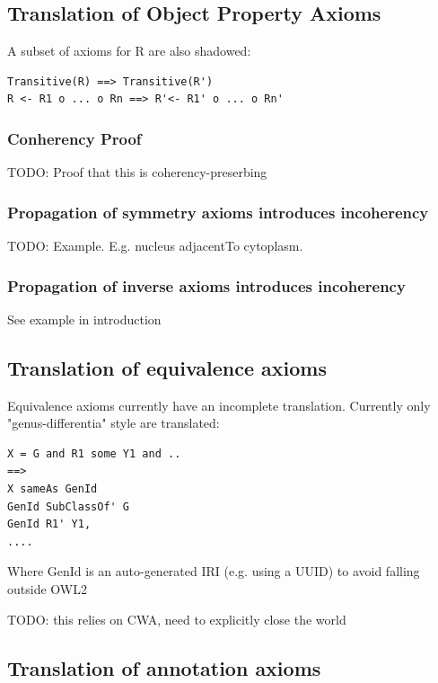 \documentclass{my}
\begin{document}
\subsection{Translation of Object Property Axioms}

A subset of axioms for R are also shadowed:

\begin{verbatim}
Transitive(R) ==> Transitive(R')
R <- R1 o ... o Rn ==> R'<- R1' o ... o Rn'
\end{verbatim}

\subsubsection{Conherency Proof} TODO: Proof that this is coherency-preserbing

\subsubsection{Propagation of symmetry axioms introduces incoherency}
TODO: Example. E.g. nucleus adjacentTo cytoplasm.

\subsubsection{Propagation of inverse axioms introduces incoherency}
See example in introduction

\subsection{Translation of equivalence axioms}

Equivalence axioms currently have an incomplete translation. Currently only "genus-differentia" style
are translated:



\begin{verbatim}
X = G and R1 some Y1 and ..
==>
X sameAs GenId
GenId SubClassOf' G
GenId R1' Y1,
....
\end{verbatim}

Where GenId is an auto-generated IRI (e.g. using a UUID) to avoid falling outside OWL2

TODO: this relies on CWA, need to explicitly close the world

\subsection{Translation of annotation axioms}
\end{document}
